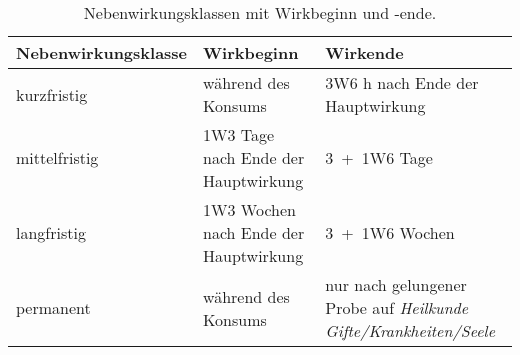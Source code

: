 {
\begin{table}
	\centering
	\caption[Nebenwirkungsklassen]{Nebenwirkungsklassen mit Wirkbeginn und -ende.\label{tbl-nebenwirkungsklassen}}
	\begin{tabularx}{\textwidth}{p{3.25cm}p{6.75cm}p{5.7cm}}
		\toprule
		Nebenwirkungsklasse & Wirkbeginn & Wirkende \\
		\hline
		kurzfristig & während des Konsums & 3W6 h nach Ende der Hauptwirkung \\
		mittelfristig & 1W3 Tage nach Ende der Hauptwirkung & 3~+~1W6 Tage \\
		langfristig & 1W3 Wochen nach Ende der Hauptwirkung & 3~+~1W6 Wochen \\
		permanent & während des Konsums & nur nach gelungener Probe auf \emph{Heilkunde Gifte/Krankheiten/Seele} \\
		\bottomrule
	\end{tabularx}
\end{table}
}